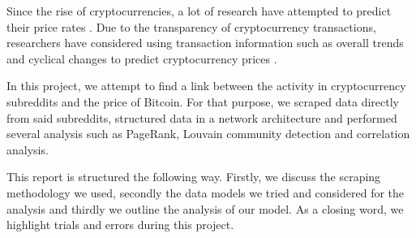 Since the rise of cryptocurrencies, a lot of research have attempted to predict their price rates \cite{kooPredictionBitcoinPrice2021,coccoPredictionsBitcoinPrices2021,liMultiwindowBitcoinPrice2021}. Due to the transparency of cryptocurrency transactions, researchers have considered using transaction information such as overall trends and cyclical changes to predict cryptocurrency prices \cite{liCrossCryptocurrencyRelationship2022}.

In this project, we attempt to find a link between the activity in cryptocurrency subreddits and the price of Bitcoin. For that purpose, we scraped data directly from said subreddits, structured data in a network architecture and performed several analysis such as PageRank, Louvain community detection and correlation analysis.

This report is structured the following way. Firstly, we discuss the scraping methodology we used, secondly the data models we tried and considered for the analysis and thirdly we outline the analysis of our model. As a closing word, we highlight trials and errors during this project.
